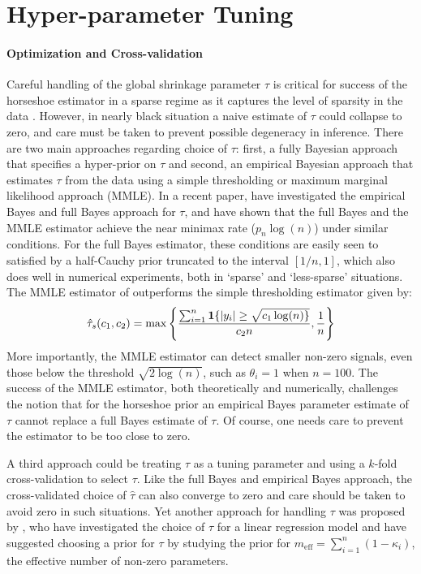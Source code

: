 \documentclass[11pt]{article}
\begin{document}
\section{Hyper-parameter Tuning}

\paragraph{Optimization and Cross-validation}

Careful handling of the global shrinkage parameter $\tau$ is critical for success of the horseshoe estimator in a sparse regime as it captures the level of sparsity in the data \citep{carvalho2010horseshoe, datta2013asymptotic, van2015conditions, van2016many}. However, in nearly black situation a naive estimate of $\tau$ could collapse to zero, and care must be taken to prevent possible degeneracy in inference. There are two main approaches regarding choice of $\tau$: first, a fully Bayesian approach that specifies a hyper-prior on $\tau$ and second, an empirical Bayesian approach that estimates $\tau$ from the data using a simple thresholding or maximum marginal likelihood approach (MMLE). In a recent paper, \citet{van2017adaptive} have investigated the empirical Bayes and full Bayes approach for $\tau$, and have shown that the full Bayes and the MMLE estimator achieve the near minimax rate ($p_n \log(n)$) under similar conditions. For the full Bayes estimator, these conditions are easily seen to satisfied by a half-Cauchy prior truncated to the interval $[1/n,1]$, which also does well in numerical experiments, both in `sparse' and `less-sparse' situations. The MMLE estimator of \citet{van2017adaptive} outperforms the simple thresholding estimator given by:
\[
\hat{\tau}_s(c_1, c_2) = \max \left \{ \frac{\sum_{i=1}^{n} {\bf 1} \{ \lvert y_i\rvert \ge \sqrt{c_1 \log(n) \}}}{c_2 n}, \frac{1}{n} \right\}
\]
More importantly, the MMLE estimator can detect smaller non-zero signals, even those below the threshold $\sqrt{2 \log(n)}$, such as $\theta_i = 1$ when $n = 100$. 
The success of the MMLE estimator, both theoretically and numerically, challenges the notion that for the horseshoe prior an empirical Bayes parameter estimate of $\tau$ cannot replace a full Bayes estimate of $\tau$. Of course, one needs care to prevent the estimator to be too close to zero. 

A third approach could be treating $\tau$ as a tuning parameter and using a $k$-fold cross-validation to select $\tau$. Like the full Bayes and empirical Bayes approach, the cross-validated choice of $\hat{\tau}$ can also converge to zero and care should be taken to avoid zero in such situations. Yet another approach for handling $\tau$ was proposed by \citet{piironen2016hyperprior}, who have investigated the choice of $\tau$ for a linear regression model and have suggested choosing a prior for $\tau$ by studying the prior for $m_{\text{eff}} = \sum_{i=1}^{n} (1-\kappa_i)$, the effective number of non-zero parameters. 
\end{document}
